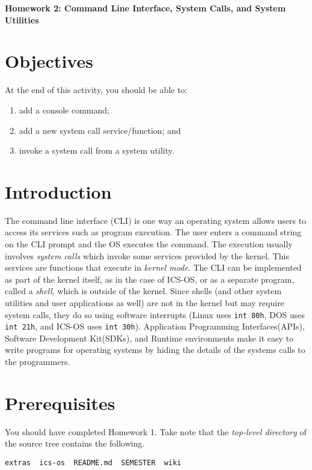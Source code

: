 \documentclass[a4paper, 11pt,oneside]{article}
\begin{document}
\begin{center}
   {\LARGE \textbf{Homework 2: Command Line Interface, System Calls, and System
Utilities }}
\end{center}

\section*{Objectives}
   At the end of this activity, you should be able to:
   \begin{enumerate}[itemsep=0pt,parsep=0pt]
       \item add a console command;
       \item add a new system call service/function; and
       \item invoke a system call from a system utility.
   \end{enumerate}   

\section{Introduction}
The command line interface (CLI) is one way an operating system allows users to
access its services such as program execution.  The user enters a command
string on the CLI prompt and the OS executes the command. The execution usually
involves \textit{system calls} which invoke some services provided by the kernel. 
This services are functions that execute in \textit{kernel mode}. 
The CLI can be implemented as part of the kernel itself,
as in the case of ICS-OS, or as a separate program, called a \textit{shell},
which is outside of the kernel.  Since shells (and other system utilities and user applications
 as well) are
not in the kernel but may require system calls, they do so using software
interrupts (Linux uses \texttt{int 80h}, DOS uses \texttt{int 21h}, and ICS-OS
uses \texttt{int 30h}). Application Programming Interfaces(APIs), Software
Development Kit(SDKs), and Runtime environments make it easy to write programs for
operating systems by hiding the details of the systems calls to the
programmers.


\section{Prerequisites}
You should have completed Homework 1.  Take note that the \textit{top-level directory} of the source 
tree contains the following. 
\begin{Verbatim}[frame=single]
extras  ics-os  README.md  SEMESTER  wiki 
\end{Verbatim}
\end{document}
